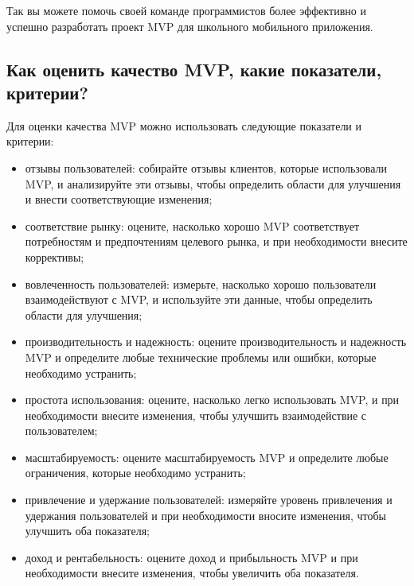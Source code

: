 \documentclass[letterpaper,10pt,russian]{sphinxmanual}
\begin{document}
\sphinxAtStartPar
Так вы можете помочь своей команде программистов более эффективно и успешно разработать проект MVP для школьного мобильного приложения.


\subsection{Как оценить качество MVP, какие показатели, критерии?}
\label{\detokenize{educational_materials/mvp/content:id8}}
\sphinxAtStartPar
Для оценки качества MVP можно использовать следующие показатели и критерии:
\begin{itemize}
\item {} 
\sphinxAtStartPar
отзывы пользователей: собирайте отзывы клиентов, которые использовали MVP, и анализируйте эти отзывы, чтобы определить области для улучшения и внести соответствующие изменения;

\item {} 
\sphinxAtStartPar
соответствие рынку: оцените, насколько хорошо MVP соответствует потребностям и предпочтениям целевого рынка, и при необходимости внесите коррективы;

\item {} 
\sphinxAtStartPar
вовлеченность пользователей: измерьте, насколько хорошо пользователи взаимодействуют с MVP, и используйте эти данные, чтобы определить области для улучшения;

\item {} 
\sphinxAtStartPar
производительность и надежность: оцените производительность и надежность MVP и определите любые технические проблемы или ошибки, которые необходимо устранить;

\item {} 
\sphinxAtStartPar
простота использования: оцените, насколько легко использовать MVP, и при необходимости внесите изменения, чтобы улучшить взаимодействие с пользователем;

\item {} 
\sphinxAtStartPar
масштабируемость: оцените масштабируемость MVP и определите любые ограничения, которые необходимо устранить;

\item {} 
\sphinxAtStartPar
привлечение и удержание пользователей: измеряйте уровень привлечения и удержания пользователей и при необходимости вносите изменения, чтобы улучшить оба показателя;

\item {} 
\sphinxAtStartPar
доход и рентабельность: оцените доход и прибыльность MVP и при необходимости внесите изменения, чтобы увеличить оба показателя.

\end{itemize}
\end{document}

